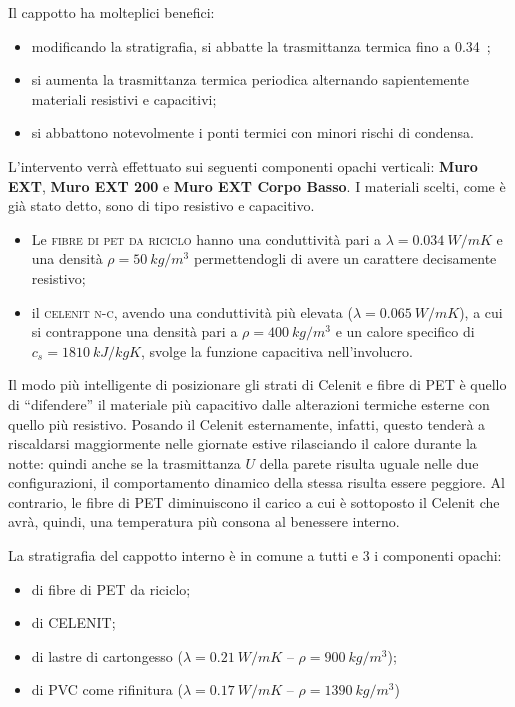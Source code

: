 Il cappotto ha molteplici benefici:
\begin{itemize}
	\item modificando la stratigrafia, si abbatte la trasmittanza termica fino \linebreak a \num{0.34}~\si{\trasm};
	\item si aumenta la trasmittanza termica periodica alternando sapientemente materiali resistivi e capacitivi;
	\item si abbattono notevolmente i ponti termici con minori rischi di condensa.
\end{itemize}
L'intervento verrà effettuato sui seguenti componenti opachi verticali: \textbf{Muro EXT}, \textbf{Muro EXT 200} e \textbf{Muro EXT Corpo Basso}. I materiali scelti, come è già stato detto, sono di tipo resistivo e capacitivo.
\begin{itemize}
	\item Le \textsc{fibre di pet da riciclo} hanno una conduttività pari a $\lambda=\SI{0.034}{W/mK}$ e una densità $\rho=\SI{50}{kg/m^3}$ permettendogli di avere un carattere decisamente resistivo;
	\item il \textsc{celenit n-c}, avendo una conduttività più elevata ($\lambda=\SI{0.065}{W/mK}$), a cui si contrappone una densità pari a $\rho=\SI{400}{kg/m^3}$ e un calore specifico di $c_s=\SI{1810}{kJ/kgK}$, svolge la funzione capacitiva nell'involucro.
\end{itemize}
Il modo più intelligente di posizionare gli strati di Celenit e fibre di PET è quello di ``difendere'' il materiale più capacitivo dalle alterazioni termiche esterne con quello più resistivo. Posando il Celenit esternamente, infatti, questo tenderà a riscaldarsi maggiormente nelle giornate estive rilasciando il calore durante la notte: quindi anche se la trasmittanza $U$ della parete risulta uguale nelle due configurazioni, il comportamento dinamico della stessa risulta essere peggiore. Al contrario, le fibre di PET diminuiscono il carico a cui è sottoposto il Celenit che avrà, quindi, una temperatura più consona al benessere interno.

La stratigrafia del cappotto interno è in comune a tutti e 3 i componenti opachi:
\begin{itemize}
	\item {} di fibre di PET da riciclo;
	\item {} di CELENIT;
	\item {} di lastre di cartongesso ($\lambda=\SI{0.21}{W/mK}$ -- $\rho=\SI{900}{kg/m^3}$);
	\item {} di PVC come rifinitura ($\lambda=\SI{0.17}{W/mK}$ -- $\rho=\SI{1390}{kg/m^3}$)
\end{itemize}

